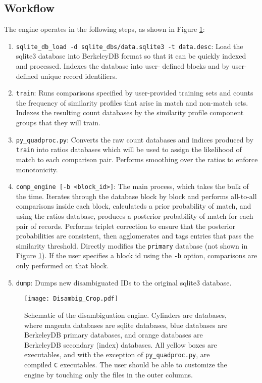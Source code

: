 \documentclass[10pt, letterpaper]{article}
\begin{document}
\subsection{Workflow}
The engine operates in the following steps, as shown in Figure \ref{schem}:
\begin{enumerate}
\item \texttt{sqlite\_db\_load -d sqlite\_dbs/data.sqlite3 -t data.desc}: Load the sqlite3 database into
BerkeleyDB format so that it can be quickly indexed and processed. Indexes the database into user-
defined blocks and by user-defined unique record identifiers. 
\item \texttt{train}: Runs comparisons specified by user-provided training sets and counts the
frequency of similarity profiles that arise in match and non-match sets. Indexes the resulting
count databases by the similarity profile component groups that they will train.
\item \texttt{py\_quadproc.py}: Converts the raw count databases and indices produced by \texttt{train}
into ratios databases which will be used to assign the likelihood of match to each comparison pair. Performs
smoothing over the ratios to enforce monotonicity.
\item \texttt{comp\_engine [-b <block\_id>]}: The main process, which takes the bulk of the time.
Iterates through the database block by block
and performs all-to-all comparisons inside each block, calculateds a prior probability of match, and using the
ratios database, produces a posterior probability of match for each pair of records. Performs triplet
correction to ensure that the posterior probabilities are consistent, then agglomerates and tags entries that
pass the similarity threshold. Directly modifies the \texttt{primary} database (not shown in Figure \ref{schem}).
If the user specifies a block id using the \texttt{-b} option, comparisons are only performed on that block.
\item \texttt{dump}: Dumps new disambiguated IDs to the original sqlite3 database.
\end{enumerate}

\begin{figure}
\centering
\texttt{[image: Disambig\_Crop.pdf]}
\caption{Schematic of the disambiguation engine. Cylinders are databases, where magenta databases are sqlite databases,
blue databases are BerkeleyDB primary databases, and orange databases are BerkeleyDB secondary (index) databases. All
yellow boxes are executables, and with the exception of \texttt{py\_quadproc.py}, are compiled \texttt{C} executables.
The user should be able to customize the engine by touching only the files in the outer columns.
\label{schem}}
\end{figure}
\end{document}
